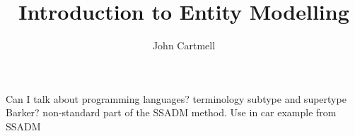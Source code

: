 \documentclass[10pt,a4paper]{article}
\title{Introduction to Entity Modelling}
\author{John Cartmell}
\newcommand{\srcFolder}{../src}
\begin{document}
\maketitle
\label{tableofcontents}
\tableofcontents
\label{contents}

 
 \newpage

 \newpage
 
 \newpage
 
 
 
 
 
 
 
 
 
 
 
 
 
 
  
 
 Can I talk about programming languages? 
terminology subtype and supertype Barker?
non-standard part of the SSADM method.
Use in car example from SSADM


\appendix



\end{document}
